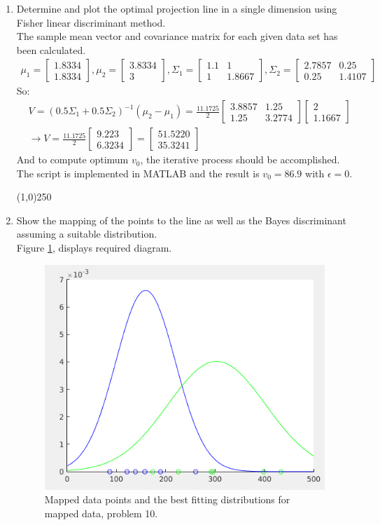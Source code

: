 \documentclass[12pt]{article}
\newcommand{\svector}[2]{\left[ \begin{matrix} #1 \\ #2 \end{matrix}\right]}
\newcommand{\smatrix}[4]{\left[ \begin{matrix} #1 & #2 \\ #3 & #4 \end{matrix}\right]}
\begin{document}
\begin{enumerate}
\item Determine and plot the optimal projection line in a single dimension using Fisher linear discriminant method. \\

The sample mean vector and covariance matrix for each given data set has been calculated.
\begin{align*}
\mu_1 = \svector{1.8334}{1.8334}, \mu_2 = \svector{3.8334}{3}, \Sigma_1 = \smatrix{1.1}{1}{1}{1.8667}, \Sigma_2 = \smatrix{2.7857}{0.25}{0.25}{1.4107}
\end{align*}
So:
\begin{align*}
&V = (0.5 \Sigma_1 + 0.5\Sigma_2)^{-1}(\mu_2 - \mu_1) = \frac{11.1725}{2}\smatrix{3.8857}{1.25}{1.25}{3.2774}\svector{2}{1.1667} \\
&\rightarrow V = \frac{11.1725}{2}\svector{9.223}{6.3234} = \svector{51.5220}{35.3241}
\end{align*}
And to compute optimum $v_0$, the iterative process should be accomplished. The script is implemented in MATLAB and the result is $v_0 = 86.9$ with $\epsilon = 0$.


\begin{center}
\line(1,0){250}
\end{center}

\item Show the mapping of the points to the line as well as the Bayes discriminant assuming a suitable distribution.\\

Figure \ref{fig:10-1}, displays required diagram.
\begin{figure}[h]
\centering
\includegraphics[scale=0.4]{Imgs/10-1.png}
\caption{Mapped data points and the best fitting distributions for mapped data, problem 10.}
\label{fig:10-1}

\end{figure}


\end{enumerate}
\end{document}
